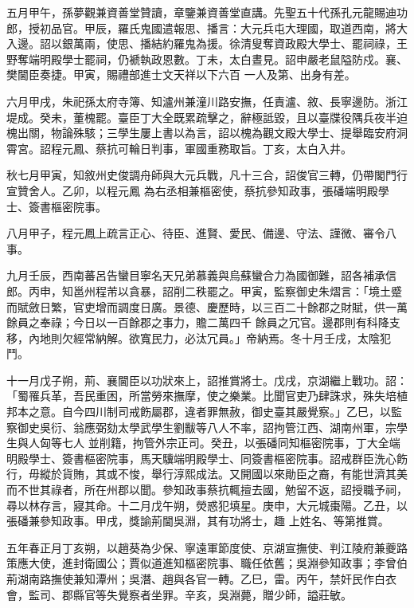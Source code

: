 \begin{pinyinscope}
 五月甲午，孫夢觀兼資善堂贊讀，章鑒兼資善堂直講。先聖五十代孫孔元龍賜迪功郎，授初品官。甲辰，羅氏鬼國遣報思、播言：大元兵屯大理國，取道西南，將大入邊。詔以銀萬兩，使思、播結約羅鬼為援。徐清叟奪資政殿大學士、罷祠祿，王野奪端明殿學士罷祠，仍褫執政恩數。丁未，太白晝見。詔申嚴老鼠隘防戍。襄、樊閫臣奏捷。甲寅，賜禮部進士文天祥以下六百
 一人及第、出身有差。



 六月甲戌，朱祀孫太府寺簿、知瀘州兼潼川路安撫，任責瀘、敘、長寧邊防。浙江堤成。癸未，董槐罷。臺臣丁大全既累疏擊之，辭極詆毀，且以臺牒役隅兵夜半迫槐出關，物論殊駭；三學生屢上書以為言，詔以槐為觀文殿大學士、提舉臨安府洞霄宮。詔程元鳳、蔡抗可輪日判事，軍國重務取旨。丁亥，太白入井。



 秋七月甲寅，知敘州史俊調舟師與大元兵戰，凡十三合，詔俊官三轉，仍帶閣門行宣贊舍人。乙卯，以程元鳳
 為右丞相兼樞密使，蔡抗參知政事，張磻端明殿學士、簽書樞密院事。



 八月甲子，程元鳳上疏言正心、待臣、進賢、愛民、備邊、守法、謹微、審令八事。



 九月壬辰，西南蕃呂告蠻目寧名天兄弟慕義與烏蘇蠻合力為國御難，詔各補承信郎。丙申，知邕州程芾以貪暴，詔削二秩罷之。甲寅，監察御史朱熠言：「境土蹙而賦斂日繁，官吏增而調度日廣。景德、慶歷時，以三百二十餘郡之財賦，供一萬餘員之奉祿；今日以一百餘郡之事力，贍二萬四千
 餘員之冗官。邊郡則有科降支移，內地則欠經常納解。欲寬民力，必汰冗員。」帝納焉。冬十月壬戌，太陰犯鬥。



 十一月戊子朔，荊、襄閫臣以功狀來上，詔推賞將士。戊戌，京湖繼上戰功。詔：「蜀罹兵革，吾民重困，所當勞來撫摩，使之樂業。比聞官吏乃肆誅求，殊失培植邦本之意。自今四川制司戒飭屬郡，違者罪無赦，御史臺其嚴覺察。」乙巳，以監察御史吳衍、翁應弼劾太學武學生劉黻等八人不率，詔拘管江西、湖南州軍，宗學生與人匈等七人
 並削籍，拘管外宗正司。癸丑，以張磻同知樞密院事，丁大全端明殿學士、簽書樞密院事，馬天驥端明殿學士、同簽書樞密院事。詔戒群臣洗心飭行，毋縱於貨賄，其或不悛，舉行淳熙成法。又開國以來勛臣之裔，有能世濟其美而不世其祿者，所在州郡以聞。參知政事蔡抗輒擅去國，勉留不返，詔授職予祠，尋以林存言，寢其命。十二月戊午朔，熒惑犯填星。庚申，大元城棗陽。乙丑，以張磻兼參知政事。甲戌，獎諭荊閫吳淵，其有功將士，趣
 上姓名、等第推賞。



 五年春正月丁亥朔，以趙葵為少保、寧遠軍節度使、京湖宣撫使、判江陵府兼夔路策應大使，進封衛國公；賈似道進知樞密院事、職任依舊；吳淵參知政事；李曾伯荊湖南路撫使兼知潭州；吳潛、趙與各官一轉。乙巳，雷。丙午，禁奸民作白衣會，監司、郡縣官等失覺察者坐罪。辛亥，吳淵薨，贈少師，謚莊敏。




\end{pinyinscope}
